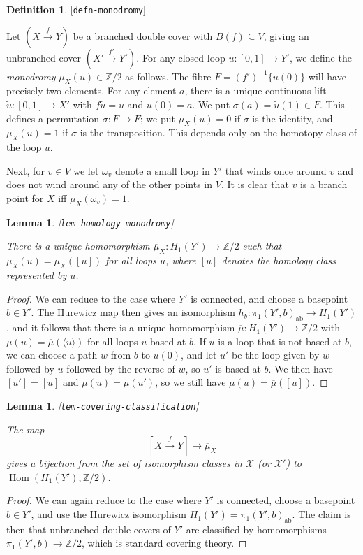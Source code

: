 \documentclass[reqno]{amsart}
\newcommand{\lbl}[1]{\label{#1}\textup{[\texttt{#1}]}\par}
\newcommand{\lbl}{\label}
\newcommand{\Hom}	{\operatorname{Hom}}
\newcommand{\om}        {\omega}
\newcommand{\sg}        {\sigma}
\newcommand{\xra}       {\xrightarrow}
\newcommand{\Z}         {{\mathbb{Z}}}
\newcommand{\ov}[1]     {\overline{#1}}
\newcommand{\ip}[1]     {\langle #1\rangle}
\newcommand{\sse}       {\subseteq}
\newcommand{\tu}	{\widetilde{u}}
\newcommand{\CX}        {\mathcal{X}}
\renewcommand{\:}{\colon}
\newtheorem{lemma}[theorem]{Lemma}
\theoremstyle{definition}
\newtheorem{definition}[theorem]{Definition}
\begin{document}
\begin{definition}\lbl{defn-monodromy}
 Let $(X\xra{f}Y)$ be a branched double cover with $B(f)\sse V$,
 giving an unbranched cover $(X'\xra{f'}Y')$.  For any closed loop
 $u\:[0,1]\to Y'$, we define the \emph{monodromy} $\mu_X(u)\in\Z/2$ as
 follows.  The fibre $F=(f')^{-1}\{u(0)\}$ will have precisely two
 elements.  For any element $a$, there is a unique continuous lift
 $\tu\:[0,1]\to X'$ with $f\tu=u$ and $u(0)=a$.  We put
 $\sg(a)=\tu(1)\in F$.  This defines a permutation $\sg\:F\to F$; we
 put $\mu_X(u)=0$ if $\sg$ is the identity, and $\mu_X(u)=1$ if $\sg$
 is the transposition.  This depends only on the homotopy class of the
 loop $u$.

 Next, for $v\in V$ we let $\om_v$ denote a small loop in $Y'$ that
 winds once around $v$ and does not wind around any of the other
 points in $V$.  It is clear that $v$ is a branch point for $X$ iff
 $\mu_X(\om_v)=1$.
\end{definition}

\begin{lemma}\lbl{lem-homology-monodromy}
 There is a unique homomorphism $\ov{\mu}_X\:H_1(Y')\to\Z/2$ such that
 $\mu_X(u)=\ov{\mu}_X([u])$ for all loops $u$, where $[u]$
 denotes the homology class represented by $u$.
\end{lemma}
\begin{proof}
 We can reduce to the case where $Y'$ is connected, and choose a
 basepoint $b\in Y'$.  The Hurewicz map then
 gives an isomorphism $h_b\:\pi_1(Y',b)_{\text{ab}}\to H_1(Y')$, and
 it follows that there is a unique homomorphism
 $\ov{\mu}\:H_1(Y')\to\Z/2$ with $\mu(u)=\ov{\mu}(\ip{u})$ for all
 loops $u$ based at $b$.  If $u$ is a loop that is not based at $b$,
 we can choose a path $w$ from $b$ to $u(0)$, and let $u'$ be the loop
 given by $w$ followed by $u$ followed by the reverse of $w$, so $u'$
 is based at $b$.  We then have $[u']=[u]$ and $\mu(u)=\mu(u')$,
 so we still have $\mu(u)=\ov{\mu}([u])$.
\end{proof}

\begin{lemma}\lbl{lem-covering-classification}
 The map
 \[ [X\xra{f}Y]\mapsto\ov{\mu}_X \]
 gives a bijection from the set of isomorphism classes in $\CX$ (or
 $\CX'$) to $\Hom(H_1(Y'),\Z/2)$.
\end{lemma}
\begin{proof}
 We can again reduce to the case where $Y'$ is connected, choose a
 basepoint $b\in Y'$, and use the Hurewicz isomorphism
 $H_1(Y')=\pi_1(Y',b)_{\text{ab}}$.  The claim is then that unbranched
 double covers of $Y'$ are classified by homomorphisms
 $\pi_1(Y',b)\to\Z/2$, which is standard covering theory.
\end{proof}
\end{document}
